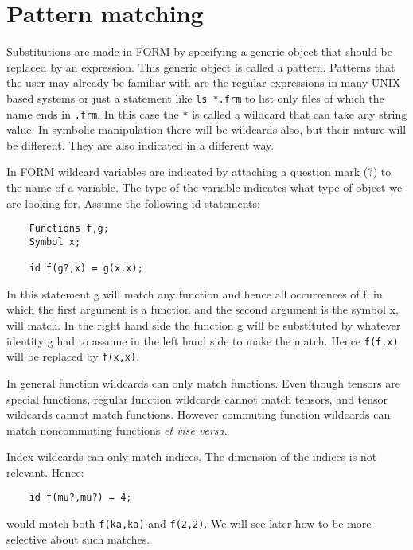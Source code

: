 \chapter{Pattern matching}
\label{pattern}

Substitutions are made in FORM 
by specifying a generic object that should be replaced by an expression. 
This generic object is called a pattern. Patterns that the 
user may already be familiar with are the regular expressions in many 
UNIX based systems or just a statement like \verb:ls *.frm: to 
list only files of which the name ends in \verb:.frm:. In this case the 
\verb:*: is called a wildcard that can take any string 
value. In symbolic manipulation there will be wildcards also, but their 
nature will be different. They are also indicated in a different way.

In FORM wildcard variables are indicated by attaching a 
question mark (?) to the name of a variable. The type 
of the variable indicates what type of object we are looking for. Assume 
the following id statements:
\begin{verbatim}
    Functions f,g;
    Symbol x;

    id f(g?,x) = g(x,x);
\end{verbatim}
In this statement g will match any function and hence all occurrences 
of f, in which the first argument is a function and the second argument is 
the symbol x, will match. In the right hand side the function g will be 
substituted by whatever identity g had to assume in the left hand side to 
make the match. Hence \verb:f(f,x): will be replaced by \verb:f(x,x):.

In general function wildcards can only match 
functions. Even though tensors are special functions, regular function 
wildcards cannot match tensors, and tensor wildcards cannot match 
functions. However commuting function wildcards can match 
noncommuting functions {\sl et vise versa}.

Index wildcards can only match indices. The 
dimension of the indices is not relevant. Hence:
\begin{verbatim}
    id f(mu?,mu?) = 4;
\end{verbatim}
would match both \verb:f(ka,ka): and \verb:f(2,2):. We will see later 
how to be more selective about such matches.

